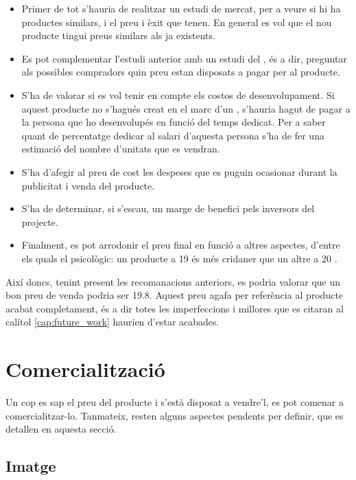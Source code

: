 \begin{itemize}
    \item Primer de tot s'hauria de realitzar un estudi de mercat, per a veure
    si hi ha productes similars, i el preu i èxit que tenen. En general es vol
    que el nou producte tingui preus similars als ja existents.
    \item Es pot complementar l'estudi anterior amb un estudi del ,
    és a dir, preguntar als possibles compradors quin preu estan disposats a
    pagar per al producte.
    \item S'ha de valorar si es vol tenir en compte els costos de
    desenvolupament. Si aquest producte no s'hagués creat en el marc d'un ,
    s'hauria hagut de pagar a la persona que ho desenvolupés en funció del
    temps dedicat. Per a saber quant de percentatge dedicar al salari d'aquesta
    persona s'ha de fer una estimació del nombre d'unitats que es vendran.
    \item S'ha d'afegir al preu de cost les despeses que es puguin ocasionar
    durant la publicitat i venda del producte.
    \item S'ha de determinar, si s'escau, un marge de benefici pels inversors
    del projecte.
    \item Finalment, es pot arrodonir el preu final en funció a altres aspectes,
    d'entre els quals el psicològic: un producte a
    \SI[round-mode=places,round-precision=0]{19}{\EUR} és més cridaner que un
    altre a \SI[round-mode=places,round-precision=0]{20}{\EUR}
    \cite{kumar2017impact}.
\end{itemize}

Així doncs, tenint present les recomanacions anteriors, es podria valorar que
un bon preu de venda podria ser
\SI{19.8}{\EUR}. Aquest preu agafa per referència al
producte acabat completament, és a dir totes les imperfeccions i millores que
es citaran al calítol \ref{cap:future_work} haurien d'estar acabades.

\section{Comercialització}

Un cop es sap el preu del producte i s'està disposat a vendre'l, es pot
comenar a comercialitzar-lo. Tanmateix, resten alguns aspectes pendents per
definir, que es detallen en aquesta secció.

\subsection{Imatge}

